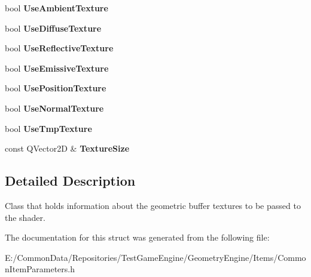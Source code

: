 \begin{DoxyCompactItemize}
bool {\bfseries Use\+Ambient\+Texture}
\item 
\mbox{\label{struct_geometry_engine_1_1_g_buffer_texture_info_a6a2826cc837bacdd679af056d98d55b4}} 
bool {\bfseries Use\+Diffuse\+Texture}
\item 
\mbox{\label{struct_geometry_engine_1_1_g_buffer_texture_info_a58dfdab3c9b2015639b6b6734f447817}} 
bool {\bfseries Use\+Reflective\+Texture}
\item 
\mbox{\label{struct_geometry_engine_1_1_g_buffer_texture_info_a839a370b51863dcede4ade7aa0c3bcc3}} 
bool {\bfseries Use\+Emissive\+Texture}
\item 
\mbox{\label{struct_geometry_engine_1_1_g_buffer_texture_info_af7857a51710f4de7a7b23708f1cef12c}} 
bool {\bfseries Use\+Position\+Texture}
\item 
\mbox{\label{struct_geometry_engine_1_1_g_buffer_texture_info_aef8eef842f157dc28cb5aec17f6ef53f}} 
bool {\bfseries Use\+Normal\+Texture}
\item 
\mbox{\label{struct_geometry_engine_1_1_g_buffer_texture_info_a1edf755a62c1455819a07b5b48bc9458}} 
bool {\bfseries Use\+Tmp\+Texture}
\item 
\mbox{\label{struct_geometry_engine_1_1_g_buffer_texture_info_a3350a95b39b831c2d8196ff7f1239f33}} 
const Q\+Vector2D \& {\bfseries Texture\+Size}
\end{DoxyCompactItemize}


\subsection{Detailed Description}
Class that holds information about the geometric buffer textures to be passed to the shader. 

The documentation for this struct was generated from the following file\+:\begin{DoxyCompactItemize}
\item 
E\+:/\+Common\+Data/\+Repositories/\+Test\+Game\+Engine/\+Geometry\+Engine/\+Items/Common\+Item\+Parameters.\+h\end{DoxyCompactItemize}
